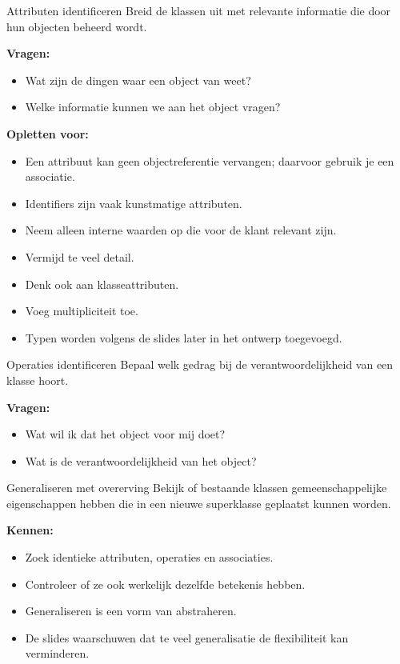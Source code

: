 \documentclass[11pt,a4paper]{article}
\begin{document}
\begin{definition}{Attributen identificeren}
Breid de klassen uit met relevante informatie die door hun objecten beheerd wordt.

\textbf{Vragen:}
\begin{itemize}
    \item Wat zijn de dingen waar een object van weet?
    \item Welke informatie kunnen we aan het object vragen?
\end{itemize}

\textbf{Opletten voor:}
\begin{itemize}
    \item Een attribuut kan geen objectreferentie vervangen; daarvoor gebruik je een associatie.
    \item Identifiers zijn vaak kunstmatige attributen.
    \item Neem alleen interne waarden op die voor de klant relevant zijn.
    \item Vermijd te veel detail.
    \item Denk ook aan klasseattributen.
    \item Voeg multipliciteit toe.
    \item Typen worden volgens de slides later in het ontwerp toegevoegd.
\end{itemize}
\end{definition}

\begin{definition}{Operaties identificeren}
Bepaal welk gedrag bij de verantwoordelijkheid van een klasse hoort.

\textbf{Vragen:}
\begin{itemize}
    \item Wat wil ik dat het object voor mij doet?
    \item Wat is de verantwoordelijkheid van het object?
\end{itemize}
\end{definition}

\begin{definition}{Generaliseren met overerving}
Bekijk of bestaande klassen gemeenschappelijke eigenschappen hebben die in een nieuwe superklasse geplaatst kunnen worden.

\textbf{Kennen:}
\begin{itemize}
    \item Zoek identieke attributen, operaties en associaties.
    \item Controleer of ze ook werkelijk dezelfde betekenis hebben.
    \item Generaliseren is een vorm van abstraheren.
    \item De slides waarschuwen dat te veel generalisatie de flexibiliteit kan verminderen.
\end{itemize}
\end{definition}
\end{document}
